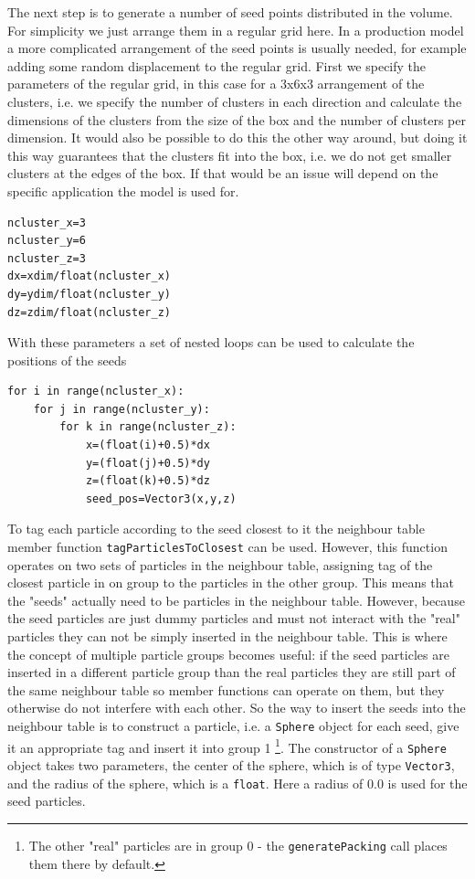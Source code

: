 The next step is to generate a number of seed points distributed in the volume. For simplicity we just arrange them in a regular grid here. In a production model a more complicated arrangement of the seed points is usually needed, for example adding some random displacement to the regular grid. First we specify the parameters of the regular grid, in this case for a 3x6x3 arrangement of the clusters, i.e. we specify the number of clusters in each direction and calculate the dimensions of the clusters from the size of the box and the number of clusters per dimension. It would also be possible to do this the other way around, but doing it this way guarantees that the clusters fit into the box, i.e. we do not get smaller clusters at the edges of the box. If that would be an issue will depend on the specific application the model is used for.  
\begin{verbatim}
ncluster_x=3
ncluster_y=6
ncluster_z=3
dx=xdim/float(ncluster_x)
dy=ydim/float(ncluster_y)
dz=zdim/float(ncluster_z)
\end{verbatim}
With these parameters a set of nested loops can be used to calculate the positions of the seeds 
\begin{verbatim}
for i in range(ncluster_x):
    for j in range(ncluster_y):
        for k in range(ncluster_z):
            x=(float(i)+0.5)*dx
            y=(float(j)+0.5)*dy
            z=(float(k)+0.5)*dz
            seed_pos=Vector3(x,y,z)
\end{verbatim} 
To tag each particle according to the seed closest to it the neighbour table member function 
\texttt{tagParticlesToClosest} can be used. However, this function operates on two sets of particles in the neighbour table, assigning tag of the closest particle in on group to the particles in the other group. This means that the "seeds" actually need to be particles in the neighbour table. However, because the seed particles are just dummy particles and must not interact with the "real" particles they can not be simply inserted in the neighbour table. This is where the concept of multiple particle groups becomes useful: if the seed particles are inserted in a different particle group than the real particles they are still part of the same neighbour table so member functions can operate on them, but they otherwise do not interfere with each other. So the way to insert the seeds into the neighbour table is to construct a particle, i.e. a \texttt{Sphere} object for each seed, give it an appropriate tag and insert it into group 1 \footnote{The other "real" particles are in group 0 - the \texttt{generatePacking} call places them there by default.}. The constructor of a \texttt{Sphere} object takes two parameters, the center of the sphere, which is of type \texttt{Vector3}, and the radius of the sphere, which is a \texttt{float}. Here a radius of 0.0 is used for the seed particles.
